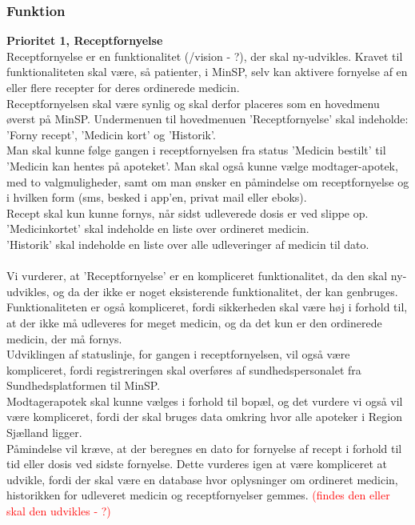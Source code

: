 \subsubsection{Funktion}  
\textbf{Prioritet 1, Receptfornyelse}\\
Receptfornyelse er en funktionalitet (/vision - ?), der skal ny-udvikles. Kravet til funktionaliteten skal være, så patienter, i MinSP, selv kan aktivere fornyelse af en eller flere recepter for deres ordinerede medicin. 
\\
Receptfornyelsen skal være synlig og skal derfor placeres som en hovedmenu øverst på MinSP. Undermenuen til hovedmenuen 'Receptfornyelse' skal indeholde: 'Forny recept', 'Medicin kort' og 'Historik'.
\\
Man skal kunne følge gangen i receptfornyelsen fra status 'Medicin bestilt' til 'Medicin kan hentes på apoteket'. Man skal også kunne vælge modtager-apotek, med to valgmuligheder, samt om man ønsker en påmindelse om receptfornyelse og i hvilken form (sms, besked i app'en, privat mail eller eboks). 
\\ 
Recept skal kun kunne fornys, når sidst udleverede dosis er ved slippe op.  
\\
'Medicinkortet' skal indeholde en liste over ordineret medicin.\\ 
'Historik' skal indeholde en liste over alle udleveringer af medicin til dato.
\\ \\
Vi vurderer, at 'Receptfornyelse' er en kompliceret funktionalitet, da den skal ny-udvikles, og da der ikke er noget eksisterende funktionalitet, der kan genbruges. Funktionaliteten er også kompliceret, fordi sikkerheden skal være høj i forhold til, at der ikke må udleveres for meget medicin, og da det kun er den ordinerede medicin, der må fornys. \\
Udviklingen af statuslinje, for gangen i receptfornyelsen, vil også være kompliceret, fordi registreringen skal overføres af sundhedspersonalet fra Sundhedsplatformen til MinSP.\\
Modtagerapotek skal kunne vælges i forhold til bopæl, og det vurdere vi også vil være kompliceret, fordi der skal bruges data omkring hvor alle apoteker i Region Sjælland ligger.\\
Påmindelse vil kræve, at der beregnes en dato for fornyelse af recept i forhold til tid eller dosis ved sidste fornyelse. Dette vurderes igen at være kompliceret at udvikle, fordi der skal være en database hvor oplysninger om ordineret medicin, historikken for udleveret medicin og receptfornyelser gemmes. \textcolor{red}{(findes den eller skal den udvikles - ?)} \\ 
